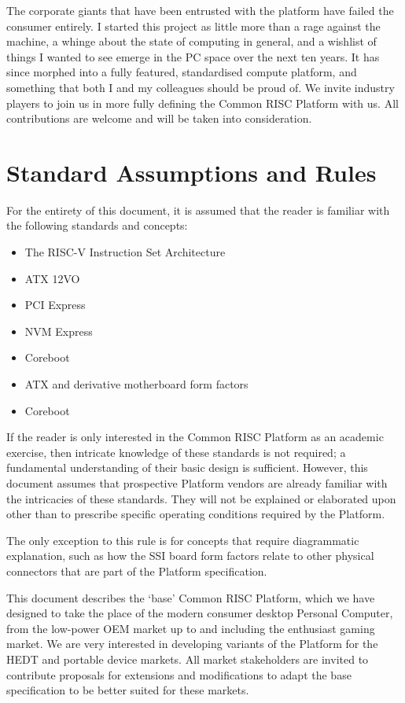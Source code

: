 \documentclass[12pt]{report}
\begin{document}
The corporate giants that have been entrusted with the platform have failed the consumer entirely. I started this project
as little more than a rage against the machine, a whinge about the state of computing in general, and a wishlist of things
I wanted to see emerge in the PC space over the next ten years. It has since morphed into a fully featured, standardised
compute platform, and something that both I and my colleagues should be proud of. We invite industry players to join us
in more fully defining the Common RISC Platform with us. All contributions are welcome and will be taken into consideration.

\newpage


\section{Standard Assumptions and Rules}
For the entirety of this document, it is assumed that the reader is familiar with the following standards and concepts:

\begin{itemize}
	\item The RISC-V Instruction Set Architecture
	\item ATX 12VO
	\item PCI Express
	\item NVM Express
	\item Coreboot
	\item ATX and derivative motherboard form factors
	\item Coreboot
\end{itemize}

If the reader is only interested in the Common RISC Platform as an academic exercise, then intricate knowledge of these
standards is not required; a fundamental understanding of their basic design is sufficient. However, this document
assumes that prospective Platform vendors are already familiar with the intricacies of these standards. They will not
be explained or elaborated upon other than to prescribe specific operating conditions required by the Platform.

The only exception to this rule is for concepts that require diagrammatic explanation, such as how the SSI board form
factors relate to other physical connectors that are part of the Platform specification.

This document describes the `base' Common RISC Platform, which we have designed to take the place of the modern consumer
desktop Personal Computer, from the low-power OEM market up to and including the enthusiast gaming market. We are very
interested in developing variants of the Platform for the HEDT and portable device markets. All market stakeholders are
invited to contribute proposals for extensions and modifications to adapt the base specification to be better suited for
these markets.
\end{document}
